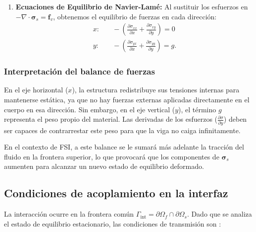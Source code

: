 \documentclass[12pt, letterpaper]{report}
\theoremstyle{definition}
\begin{document}
\begin{enumerate}
    \item \textbf{Ecuaciones de Equilibrio de Navier-Lamé:} Al sustituir los esfuerzos en \\ $-\nabla \cdot \boldsymbol{\sigma}_s = \mathbf{f}_v$, obtenemos el equilibrio de fuerzas en cada dirección:
    \begin{align}
        x: & \quad -\left( \frac{\partial \sigma_{xx}}{\partial x} + \frac{\partial \sigma_{xy}}{\partial y} \right) = 0 \\
        y: & \quad -\left( \frac{\partial \sigma_{yx}}{\partial x} + \frac{\partial \sigma_{yy}}{\partial y} \right) = g.
    \end{align}
\end{enumerate}

\subsubsection{Interpretación del balance de fuerzas}

En el eje horizontal ($x$), la estructura redistribuye sus tensiones internas para mantenerse estática, ya que no hay fuerzas externas aplicadas directamente en el cuerpo en esa dirección. Sin embargo, en el eje vertical ($y$), el término $g$ representa el peso propio del material. Las derivadas de los esfuerzos ($\frac{\partial \sigma}{\partial y}$) deben ser capaces de contrarrestar este peso para que la viga no caiga infinitamente. 

En el contexto de FSI, a este balance se le sumará más adelante la tracción del fluido en la frontera superior, lo que provocará que los componentes de $\boldsymbol{\sigma}_s$ aumenten para alcanzar un nuevo estado de equilibrio deformado.

\subsection{Condiciones de acoplamiento en la interfaz}
\label{subsec:acoplamiento_interfaz}
La interacción ocurre en la frontera común $\Gamma_{\text{int}} = \partial \Omega_f \cap \partial \Omega_s$. Dado que se analiza el estado de equilibrio estacionario, las condiciones de transmisión son \cite{donea2004arbitrary}:
\end{document}
